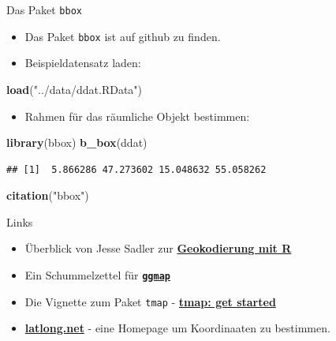 \documentclass[ignorenonframetext,]{beamer}
\newenvironment{Shaded}{\begin{snugshade}}{\end{snugshade}}
\newcommand{\KeywordTok}[1]{\textcolor[rgb]{0.26,0.66,0.93}{\textbf{#1}}}
\newcommand{\NormalTok}[1]{\textcolor[rgb]{0.74,0.68,0.62}{#1}}
\newcommand{\StringTok}[1]{\textcolor[rgb]{0.02,0.61,0.04}{#1}}
\providecommand{\tightlist}{%
  \setlength{\itemsep}{0pt}\setlength{\parskip}{0pt}}
\begin{document}
\begin{frame}[fragile]{Das Paket \texttt{bbox}}
\protect\hypertarget{das-paket-bbox}{}

\begin{itemize}
\item
  Das Paket \texttt{bbox} ist auf github zu finden.
\item
  Beispieldatensatz laden:
\end{itemize}

\begin{Shaded}
\begin{Highlighting}[]
\KeywordTok{load}\NormalTok{(}\StringTok{"../data/ddat.RData"}\NormalTok{)}
\end{Highlighting}
\end{Shaded}

\begin{itemize}
\tightlist
\item
  Rahmen für das räumliche Objekt bestimmen:
\end{itemize}

\begin{Shaded}
\begin{Highlighting}[]
\KeywordTok{library}\NormalTok{(bbox)}
\KeywordTok{b_box}\NormalTok{(ddat)}
\end{Highlighting}
\end{Shaded}

\begin{verbatim}
## [1]  5.866286 47.273602 15.048632 55.058262
\end{verbatim}

\begin{Shaded}
\begin{Highlighting}[]
\KeywordTok{citation}\NormalTok{(}\StringTok{"bbox"}\NormalTok{)}
\end{Highlighting}
\end{Shaded}

\end{frame}

\begin{frame}[fragile]{Links}
\protect\hypertarget{links}{}

\begin{itemize}
\item
  Überblick von Jesse Sadler zur
  \href{https://www.jessesadler.com/post/geocoding-with-r/}{\textbf{Geokodierung
  mit R}}
\item
  Ein Schummelzettel für
  \href{https://www.nceas.ucsb.edu/~frazier/RSpatialGuides/ggmap/ggmapCheatsheet.pdf}{\textbf{\texttt{ggmap}}}
\item
  Die Vignette zum Paket \texttt{tmap} -
  \href{https://cran.r-project.org/web/packages/tmap/vignettes/tmap-getstarted.html}{\textbf{tmap:
  get started}}
\item
  \href{https://www.latlong.net/place/hamburg-germany-8766.html}{\textbf{latlong.net}}
  - eine Homepage um Koordinaaten zu bestimmen.
\end{itemize}

\end{frame}
\end{document}
